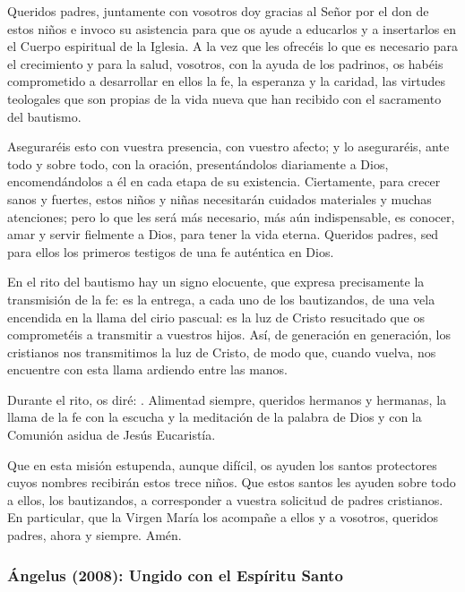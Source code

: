 \begin{body}
					Queridos padres, juntamente con vosotros doy gracias al Señor por el don de estos niños e invoco su asistencia para que os ayude a educarlos y a insertarlos en el Cuerpo espiritual de la Iglesia. A la vez que les ofrecéis lo que es necesario para el crecimiento y para la salud, vosotros, con la ayuda de los padrinos, os habéis comprometido a desarrollar en ellos la fe, la esperanza y la caridad, las virtudes teologales que son propias de la vida nueva que han recibido con el sacramento del bautismo.
					
					Aseguraréis esto con vuestra presencia, con vuestro afecto; y lo aseguraréis, ante todo y sobre todo, con la oración, presentándolos diariamente a Dios, encomendándolos a él en cada etapa de su existencia. Ciertamente, para crecer sanos y fuertes, estos niños y niñas necesitarán cuidados materiales y muchas atenciones; pero lo que les será más necesario, más aún indispensable, es conocer, amar y servir fielmente a Dios, para tener la vida eterna. Queridos padres, sed para ellos los primeros testigos de una fe auténtica en Dios.
					
					En el rito del bautismo hay un signo elocuente, que expresa precisamente la transmisión de la fe: es la entrega, a cada uno de los bautizandos, de una vela encendida en la llama del cirio pascual: es la luz de Cristo resucitado que os comprometéis a transmitir a vuestros hijos. Así, de generación en generación, los cristianos nos transmitimos la luz de Cristo, de modo que, cuando vuelva, nos encuentre con esta llama ardiendo entre las manos.
					
					Durante el rito, os diré: . Alimentad siempre, queridos hermanos y hermanas, la llama de la fe con la escucha y la meditación de la palabra de Dios y con la Comunión asidua de Jesús Eucaristía.
					
					Que en esta misión estupenda, aunque difícil, os ayuden los santos protectores cuyos nombres recibirán estos trece niños. Que estos santos les ayuden sobre todo a ellos, los bautizandos, a corresponder a vuestra solicitud de padres cristianos. En particular, que la Virgen María los acompañe a ellos y a vosotros, queridos padres, ahora y siempre. Amén.
				\end{body}
			
			\subsubsection{Ángelus (2008): Ungido con el Espíritu Santo}
			
